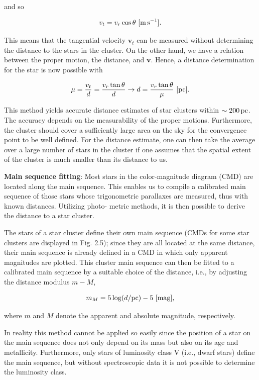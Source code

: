 \documentclass[a4paper,11pt]{article}
\begin{document}
{\noindent}and so

\begin{align*}
    v_t = v_r\cos\theta ~ [{\rm m\,s^{-1}}].
\end{align*}

{\noindent}This means that the tangential velocity $\mathbf{v}_t$ can be measured without determining the distance to the stars in the cluster. On the other hand, we have a relation between the proper motion, the distance, and $\mathbf{v}$. Hence, a distance determination for the star is now possible with

\begin{align*}
    \mu = \frac{v_t}{d} = \frac{v_r\tan\theta}{d} \rightarrow d = \frac{v_r\tan\theta}{\mu} ~ [{\rm pc}].
\end{align*}

{\noindent}This method yields accurate distance estimates of star clusters within $\sim200\,{\rm pc}$. The accuracy depends on the measurability of the proper motions. Furthermore, the cluster should cover a sufficiently large area on the sky for the convergence point to be well defined. For the distance estimate, one can then take the average over a large number of stars in the cluster if one assumes that the spatial extent of the cluster is much smaller than its distance to us.

{\noindent}\textbf{Main sequence fitting}: Most stars in the color-magnitude diagram (CMD) are located along the main sequence. This enables us to compile a calibrated main sequence of those stars whose trigonometric parallaxes are measured, thus with known distances. Utilizing photo- metric methods, it is then possible to derive the distance to a star cluster. 

{\noindent}The stars of a star cluster define their own main sequence (CMDs for some star clusters are displayed in Fig. 2.5); since they are all located at the same distance, their main sequence is already defined in a CMD in which only apparent magnitudes are plotted. This cluster main sequence can then be fitted to a calibrated main sequence by a suitable choice of the distance, i.e., by adjusting the distance modulus $m-M$,

\begin{align*}
    m_M = 5\log(d/{\rm pc}) - 5 ~ [{\rm mag}],
\end{align*}

{\noindent}where $m$ and $M$ denote the apparent and absolute magnitude, respectively.

{\noindent}In reality this method cannot be applied so easily since the position of a star on the main sequence does not only depend on its mass but also on its age and metallicity. Furthermore, only stars of luminosity class V (i.e., dwarf stars) define the main sequence, but without spectroscopic data it is not possible to determine the luminosity class.
\end{document}
